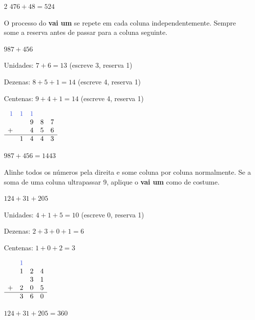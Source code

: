 \documentclass[12pt]{article}
\begin{document}
\begin{multicols}{2}
$476 + 48 = 524$


O processo do \textbf{vai um} se repete em cada coluna independentemente. Sempre some a reserva antes de passar para a coluna seguinte.

 $987 + 456$

\vspace{4pt}

Unidades: $7 + 6 = 13$ (escreve 3, reserva 1)

Dezenas: $8 + 5 + 1 = 14$ (escreve 4, reserva 1)

Centenas: $9 + 4 + 1 = 14$ (escreve 4, reserva 1)

$\begin{array}{rrrrr}
\textcolor{iris}{1} & \textcolor{iris}{1} & \textcolor{iris}{1} & & \\
& & 9 & 8 & 7 \\
+ & & 4 & 5 & 6 \\
\hline
& 1 & 4 & 4 & 3 \\
\end{array}$

$987 + 456 = 1443$


Alinhe todos os números pela direita e some coluna por coluna normalmente. Se a soma de uma coluna ultrapassar 9, aplique o \textbf{vai um} como de costume.

 $124 + 31 + 205$

\vspace{4pt}

Unidades: $4 + 1 + 5 = 10$ (escreve 0, reserva 1)

Dezenas: $2 + 3 + 0 + 1 = 6$

Centenas: $1 + 0 + 2 = 3$

$\begin{array}{rrrr}
& \textcolor{iris}{1} & & \\
& 1 & 2 & 4 \\
& & 3 & 1 \\
+ & 2 & 0 & 5 \\
\hline
& 3 & 6 & 0 \\
\end{array}$

$124 + 31 + 205 = 360$



\end{multicols}
\end{document}
